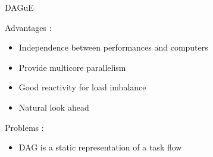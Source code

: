 \begin{frame}{DAGuE}
\begin{exampleblock}{Advantages :}
\begin{itemize}
\item Independence between performances and computers
\item Provide multicore parallelism
\item Good reactivity for load imbalance
\item Natural look ahead
\end{itemize}
\end{exampleblock}{}
\pause
\begin{exampleblock}{Problems :}
\begin{itemize}
\item DAG is a static representation of a task flow
\end{itemize}
\end{exampleblock}{}
\end{frame}

